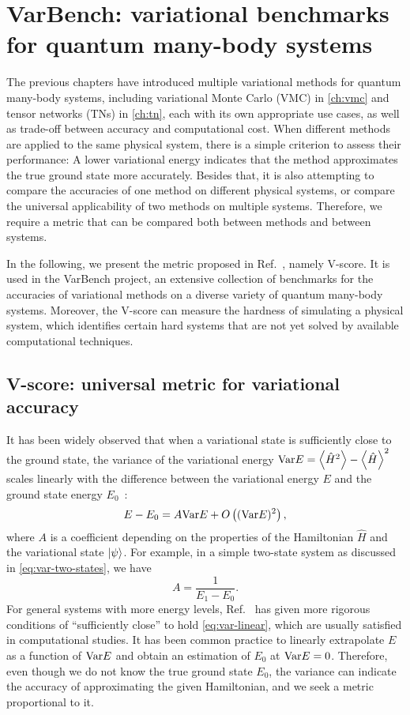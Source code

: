 \chapter{VarBench: variational benchmarks for quantum many-body systems}
\label{ch:varbench}

The previous chapters have introduced multiple variational methods for quantum many-body systems, including variational Monte Carlo (VMC) in \cref{ch:vmc} and tensor networks (TNs) in \cref{ch:tn}, each with its own appropriate use cases, as well as trade-off between accuracy and computational cost. When different methods are applied to the same physical system, there is a simple criterion to assess their performance: A lower variational energy indicates that the method approximates the true ground state more accurately. Besides that, it is also attempting to compare the accuracies of one method on different physical systems, or compare the universal applicability of two methods on multiple systems. Therefore, we require a metric that can be compared both between methods and between systems.

In the following, we present the metric proposed in Ref.~\cite{wu2024variational}, namely V-score. It is used in the VarBench project, an extensive collection of benchmarks for the accuracies of variational methods on a diverse variety of quantum many-body systems. Moreover, the V-score can measure the hardness of simulating a physical system, which identifies certain hard systems that are not yet solved by available computational techniques.

\section{V-score: universal metric for variational accuracy}

It has been widely observed that when a variational state is sufficiently close to the ground state, the variance of the variational energy $\Var E = \ev{\hat{H}^2} - \ev{\hat{H}}^2$ scales linearly with the difference between the variational energy $E$ and the ground state energy $E_0$~\cite{kwon1993, imada2000, sorella2001}:
\begin{equation}
E  - E_0 = A \mathrm{Var} E + O\left( (\mathrm{Var} E)^2 \right),
\label{eq:var-linear}
\end{equation}
where $A$ is a coefficient depending on the properties of the Hamiltonian $\hat{H}$ and the variational state $\ket{\psi}$. For example, in a simple two-state system as discussed in \cref{eq:var-two-states}, we have
\begin{equation}
A = \frac{1}{E_1 - E_0}.
\end{equation}
For general systems with more energy levels, Ref.~\cite{taddei2015iterative} has given more rigorous conditions of ``sufficiently close'' to hold \cref{eq:var-linear}, which are usually satisfied in computational studies. It has been common practice to linearly extrapolate $E$ as a function of $\mathrm{Var} E$ and obtain an estimation of $E_0$ at $\mathrm{Var} E = 0$. Therefore, even though we do not know the true ground state $E_0$, the variance can indicate the accuracy of approximating the given Hamiltonian, and we seek a metric proportional to it.

